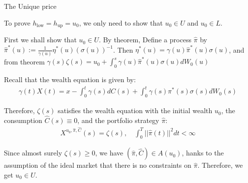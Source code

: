 \documentclass{beamer}
\begin{document}
\begin{frame}{The Unique price}

    {\footnotesize \footnotesize
    \par To prove \( h_{\text{low}} = h_{\text{up}} = u_0 \), we only need to show that \( u_0 \in U \) and \( u_0 \in L \).
    \vspace{1em}
    \par First we shall show that \( u_0 \in U \). By theorem, Define a process \(\hat{\pi}\) by $\hat{\pi}^*(u) := \frac{1}{\gamma(u)} \eta^*(u)(\sigma(u))^{-1}$. 
    Then $\eta^*(u) = \gamma(u) \hat{\pi}^*(u) \sigma(u)$, and from theorem $\gamma(s) \zeta(s) = u_0 + \int_0^s \gamma(u) \hat{\pi}^*(u) \sigma(u) dW_0(u)$
    \vspace{1em}
    \par Recall that the wealth equation is given by:
    \begin{align*}
        \gamma(t) X(t) = x - \int_0^t \gamma(s) dC(s) + \int_0^t \gamma(s) \pi^*(s) \sigma(s) dW_0(s)
    \end{align*}
    \par Therefore, \(\zeta(s)\) satisfies 
    the wealth equation with the initial wealth \( u_0 \), the 
    consumption \(\hat{C}(s) \equiv 0\), and the portfolio strategy \(\hat{\pi}\):
    \begin{align*}
        X^{u_0, \hat{\pi}, \hat{C}}(s) = \zeta(s), \quad \int_0^T ||\hat{\pi}(t)||^2 dt < \infty
    \end{align*}
    \par Since almost surely \(\zeta(s) \geq 0\), we have \(\left( \hat{\pi}, \hat{C} \right) \in A(u_0)\), 
    hanks to the assumption of the ideal market that there is no constraints on \(\hat{\pi}\). Therefore, we get \( u_0 \in U \).
    }

\end{frame}
\end{document}
